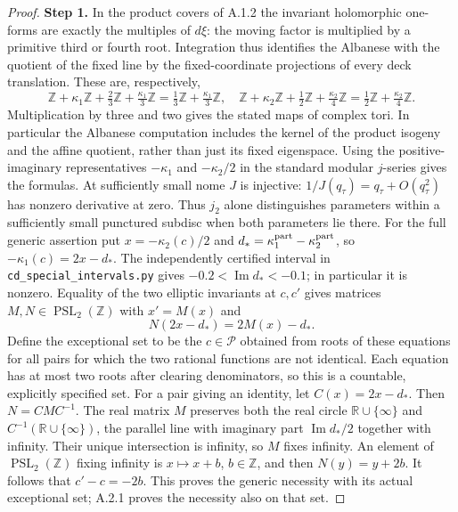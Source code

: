 \begin{proof}
\par\smallskip\noindent\textbf{Step 1.} In the product covers of A.1.2 the invariant holomorphic one-forms are exactly the multiples of $d\xi$: the moving factor is multiplied by a primitive third or fourth root. Integration thus identifies the Albanese with the quotient of the fixed line by the fixed-coordinate projections of every deck translation. These are, respectively,
\[
 \mathbb Z+\kappa_1\mathbb Z+\tfrac23\mathbb Z+\tfrac{\kappa_1}3\mathbb Z
   =\tfrac13\mathbb Z+\tfrac{\kappa_1}3\mathbb Z,
\quad
 \mathbb Z+\kappa_2\mathbb Z+\tfrac12\mathbb Z+\tfrac{\kappa_2}4\mathbb Z
   =\tfrac12\mathbb Z+\tfrac{\kappa_2}4\mathbb Z.
\]
Multiplication by three and two gives the stated maps of complex tori. In particular the Albanese computation includes the kernel of the product isogeny and the affine quotient, rather than just its fixed eigenspace. Using the positive-imaginary representatives $-\kappa_1$ and $-\kappa_2/2$ in the standard modular $j$-series gives the formulas. At sufficiently small nome $J$ is injective: $1/J(q_\tau)=q_\tau+O(q_\tau^2)$ has nonzero derivative at zero. Thus $j_2$ alone distinguishes parameters within a sufficiently small punctured subdisc when both parameters lie there. For the full generic assertion put $x=-\kappa_2(c)/2$ and $d_*=\kappa_1^{\rm part}-\kappa_2^{\rm part}$, so $-\kappa_1(c)=2x-d_*$. The independently certified interval in \texttt{cd\_special\_intervals.py} gives $-0.2<\operatorname{Im}d_*<-0.1$; in particular it is nonzero. Equality of the two elliptic invariants at $c,c'$ gives matrices $M,N\in\operatorname{PSL}_2(\mathbb Z)$ with $x'=M(x)$ and
\[
 N(2x-d_*)=2M(x)-d_*.
\]
Define the exceptional set to be the $c\in\mathcal P$ obtained from roots of these equations for all pairs for which the two rational functions are not identical. Each equation has at most two roots after clearing denominators, so this is a countable, explicitly specified set. For a pair giving an identity, let $C(x)=2x-d_*$. Then $N=CMC^{-1}$. The real matrix $M$ preserves both the real circle $\mathbb R\cup\{\infty\}$ and $C^{-1}(\mathbb R\cup\{\infty\})$, the parallel line with imaginary part $\operatorname{Im}d_*/2$ together with infinity. Their unique intersection is infinity, so $M$ fixes infinity. An element of $\operatorname{PSL}_2(\mathbb Z)$ fixing infinity is $x\mapsto x+b$, $b\in\mathbb Z$, and then $N(y)=y+2b$. It follows that $c'-c=-2b$. This proves the generic necessity with its actual exceptional set; A.2.1 proves the necessity also on that set.
\end{proof}
